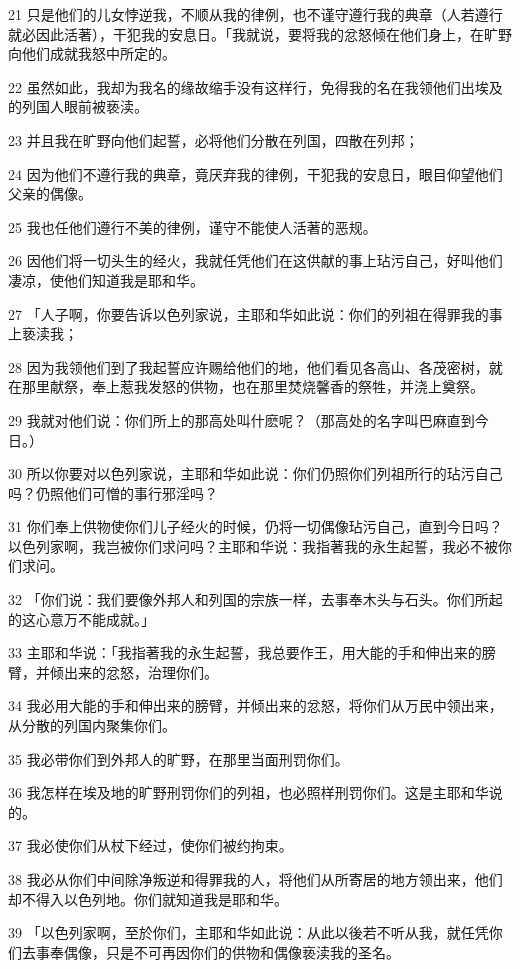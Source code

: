 \par 21 只是他们的儿女悖逆我，不顺从我的律例，也不谨守遵行我的典章（人若遵行就必因此活著），干犯我的安息日。「我就说，要将我的忿怒倾在他们身上，在旷野向他们成就我怒中所定的。
\par 22 虽然如此，我却为我名的缘故缩手没有这样行，免得我的名在我领他们出埃及的列国人眼前被亵渎。
\par 23 并且我在旷野向他们起誓，必将他们分散在列国，四散在列邦；
\par 24 因为他们不遵行我的典章，竟厌弃我的律例，干犯我的安息日，眼目仰望他们父亲的偶像。
\par 25 我也任他们遵行不美的律例，谨守不能使人活著的恶规。
\par 26 因他们将一切头生的经火，我就任凭他们在这供献的事上玷污自己，好叫他们凄凉，使他们知道我是耶和华。
\par 27 「人子啊，你要告诉以色列家说，主耶和华如此说：你们的列祖在得罪我的事上亵渎我；
\par 28 因为我领他们到了我起誓应许赐给他们的地，他们看见各高山、各茂密树，就在那里献祭，奉上惹我发怒的供物，也在那里焚烧馨香的祭牲，并浇上奠祭。
\par 29 我就对他们说：你们所上的那高处叫什麽呢？（那高处的名字叫巴麻直到今日。）
\par 30 所以你要对以色列家说，主耶和华如此说：你们仍照你们列祖所行的玷污自己吗？仍照他们可憎的事行邪淫吗？
\par 31 你们奉上供物使你们儿子经火的时候，仍将一切偶像玷污自己，直到今日吗？以色列家啊，我岂被你们求问吗？主耶和华说：我指著我的永生起誓，我必不被你们求问。
\par 32 「你们说：我们要像外邦人和列国的宗族一样，去事奉木头与石头。你们所起的这心意万不能成就。」
\par 33 主耶和华说：「我指著我的永生起誓，我总要作王，用大能的手和伸出来的膀臂，并倾出来的忿怒，治理你们。
\par 34 我必用大能的手和伸出来的膀臂，并倾出来的忿怒，将你们从万民中领出来，从分散的列国内聚集你们。
\par 35 我必带你们到外邦人的旷野，在那里当面刑罚你们。
\par 36 我怎样在埃及地的旷野刑罚你们的列祖，也必照样刑罚你们。这是主耶和华说的。
\par 37 我必使你们从杖下经过，使你们被约拘束。
\par 38 我必从你们中间除净叛逆和得罪我的人，将他们从所寄居的地方领出来，他们却不得入以色列地。你们就知道我是耶和华。
\par 39 「以色列家啊，至於你们，主耶和华如此说：从此以後若不听从我，就任凭你们去事奉偶像，只是不可再因你们的供物和偶像亵渎我的圣名。
